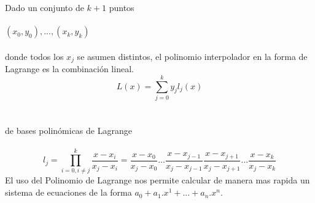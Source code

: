  Dado un conjunto de $k + 1$ puntos\\\\
 $(x_0,y_0),...,(x_k,y_k)$\\\\
 donde todos los $x_j$ se asumen distintos, el polinomio interpolador en la forma de Lagrange es la combinación lineal.
 \begin{equation}
  L(x)=\sum_{j=0}^{k}y_jl_j(x)
 \end{equation}
 \\\\
 de bases polinómicas de Lagrange\\\\
 \begin{equation}
  l_j=\prod_{i=0,i\neq j}^{k}\frac{x-x_i}{x_j-x_i}=\frac{x-x_0}{x_j-x_0}...\frac{x-x_{j-1}}{x_j-x_{j-1}}\frac{x-x_{j+1}}{x_j-x_{j+1}}...\frac{x-x_k}{x_j-x_k}
 \end{equation}
El uso del Polinomio de Lagrange nos permite calcular de manera mas rapida un sistema de ecuaciones de la forma $a_0+a_1.x^1+...+a_n.x^n$.
